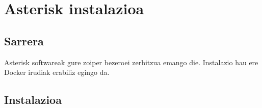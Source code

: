 \chapter[Asterisk instalazioa]{Asterisk instalazioa}
\label{chp:asterisk-install}

\localtableofcontents

\section{Sarrera}

Asterisk softwareak gure zoiper bezeroei zerbitzua emango die. Instalazio hau ere Docker irudiak erabiliz egingo da.

\section{Instalazioa}

